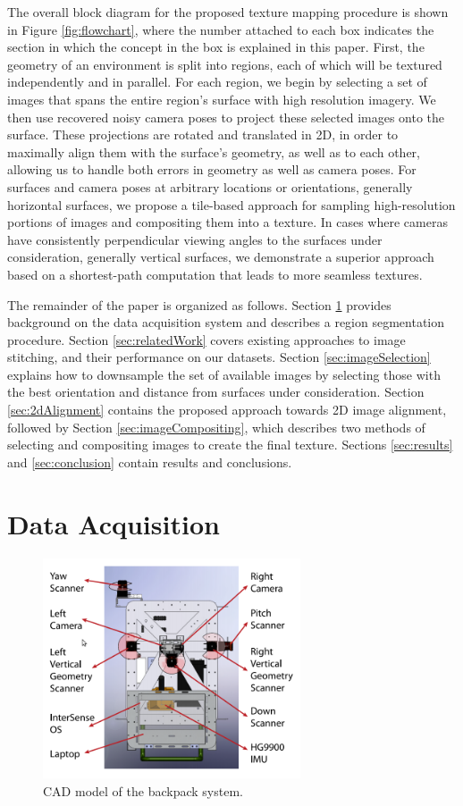 \documentclass[]{spie}  %
\begin{document}
The overall block diagram for the proposed texture mapping procedure
is shown in Figure \ref{fig:flowchart}, where the number attached to
each box indicates the section in which the concept in the box is
explained in this paper. First, the geometry of an environment is
split into regions, each of which will be textured independently and
in parallel. For each region, we begin by selecting a set of images
that spans the entire region's surface with high resolution
imagery. We then use recovered noisy camera poses to project these
selected images onto the surface. These projections are rotated and
translated in 2D, in order to maximally align them with the surface's
geometry, as well as to each other, allowing us to handle both errors
in geometry as well as camera poses. For surfaces and camera poses at
arbitrary locations or orientations, generally horizontal surfaces, we
propose a tile-based approach for sampling high-resolution portions of
images and compositing them into a texture. In cases where cameras
have consistently perpendicular viewing angles to the surfaces under
consideration, generally vertical surfaces, we demonstrate a superior
approach based on a shortest-path computation that leads to more
seamless textures.

The remainder of the paper is organized as follows. Section
\ref{sec:dataAcquisition} provides background on the data acquisition
system and describes a region segmentation procedure. Section
\ref{sec:relatedWork} covers existing approaches to image stitching,
and their performance on our datasets. Section
\ref{sec:imageSelection} explains how to downsample the set of
available images by selecting those with the best orientation and
distance from surfaces under consideration. Section
\ref{sec:2dAlignment} contains the proposed approach towards 2D image
alignment, followed by Section \ref{sec:imageCompositing}, which
describes two methods of selecting and compositing images to create
the final texture. Sections \ref{sec:results} and \ref{sec:conclusion}
contain results and conclusions.

\section{Data Acquisition}
\label{sec:dataAcquisition}

\begin{figure}
  \centering
  \includegraphics[width=3in]{backpackCAD.png}
  \caption{CAD model of the backpack system.}
  \label{fig:backpack}
\end{figure}
\end{document}

